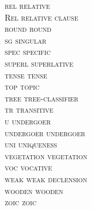 \documentclass[output=collectionpaper]{langsci/langscibook}
\begin{document}
\begin{multicols}{2}
\begin{tabbing}
\scshape rel	\>	relative	\\
\normalfont Rel	\>	relative clause	\\
\scshape round	\>	round	\\
\scshape sg	\>	singular	\\
\scshape spec	\>	specific	\\
\scshape superl	\>	superlative	\\
\scshape tense	\>	tense	\\
\scshape top	\>	topic	\\
\scshape tree	\>	tree-classifier	\\
\scshape tr	\>	transitive	\\
\scshape u	\>	undergoer	\\
\scshape undergoer	\>	undergoer	\\
\scshape uni	\>	uniqueness	\\
\scshape vegetation	\>	vegetation	\\
\scshape voc	\>	vocative	\\
\scshape weak	\>	weak declension	\\
\scshape wooden	\>	wooden	\\
\scshape zoic	\>	zoic	\\
\end{tabbing}
\end{multicols}

\nocite{Iraya1991}
\nocite{KahuaBible2011}
\nocite{NalcaNT}
\nocite{UnaNT2007}

{\sloppy\printbibliography[heading=subbibliography,title={Translations of New Testaments used},keyword=bible]}

{\sloppy\printbibliography[heading=subbibliography,notkeyword=this,notkeyword=bible]}
\end{document}
